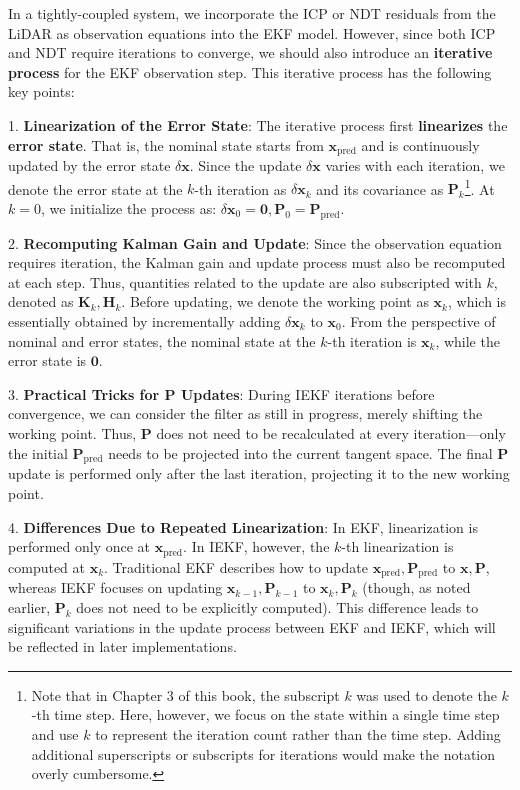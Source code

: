 In a tightly-coupled system, we incorporate the ICP or NDT residuals from the LiDAR as observation equations into the EKF model. However, since both ICP and NDT require iterations to converge, we should also introduce an \textbf{iterative process} for the EKF observation step. This iterative process has the following key points:  

1. \textbf{Linearization of the Error State}: The iterative process first \textbf{linearizes} the \textbf{error state}. That is, the nominal state starts from \(\mathbf{x}_{\mathrm{pred}}\) and is continuously updated by the error state \(\delta \mathbf{x}\). Since the update \(\delta \mathbf{x}\) varies with each iteration, we denote the error state at the \(k\)-th iteration as \(\delta \mathbf{x}_k\) and its covariance as \(\mathbf{P}_k\)\footnote{Note that in Chapter 3 of this book, the subscript \(k\) was used to denote the \(k\)-th time step. Here, however, we focus on the state within a single time step and use \(k\) to represent the iteration count rather than the time step. Adding additional superscripts or subscripts for iterations would make the notation overly cumbersome.}. At \(k=0\), we initialize the process as: \(\delta \mathbf{x}_{0} = \mathbf{0}, \mathbf{P}_0 = \mathbf{P}_{\mathrm{pred}}\).  

2. \textbf{Recomputing Kalman Gain and Update}: Since the observation equation requires iteration, the Kalman gain and update process must also be recomputed at each step. Thus, quantities related to the update are also subscripted with \(k\), denoted as \(\mathbf{K}_k, \mathbf{H}_k\). Before updating, we denote the working point as \(\mathbf{x}_k\), which is essentially obtained by incrementally adding \(\delta \mathbf{x}_k\) to \(\mathbf{x}_0\). From the perspective of nominal and error states, the nominal state at the \(k\)-th iteration is \(\mathbf{x}_k\), while the error state is \(\mathbf{0}\).  

3. \textbf{Practical Tricks for \(\mathbf{P}\) Updates}: During IEKF iterations before convergence, we can consider the filter as still in progress, merely shifting the working point. Thus, \(\mathbf{P}\) does not need to be recalculated at every iteration—only the initial \(\mathbf{P}_{\mathrm{pred}}\) needs to be projected into the current tangent space. The final \(\mathbf{P}\) update is performed only after the last iteration, projecting it to the new working point.  

4. \textbf{Differences Due to Repeated Linearization}: In EKF, linearization is performed only once at \(\mathbf{x}_{\mathrm{pred}}\). In IEKF, however, the \(k\)-th linearization is computed at \(\mathbf{x}_k\). Traditional EKF describes how to update \(\mathbf{x}_{\mathrm{pred}}, \mathbf{P}_{\mathrm{pred}}\) to \(\mathbf{x}, \mathbf{P}\), whereas IEKF focuses on updating \(\mathbf{x}_{k-1}, \mathbf{P}_{k-1}\) to \(\mathbf{x}_{k}, \mathbf{P}_k\) (though, as noted earlier, \(\mathbf{P}_k\) does not need to be explicitly computed). This difference leads to significant variations in the update process between EKF and IEKF, which will be reflected in later implementations.  

